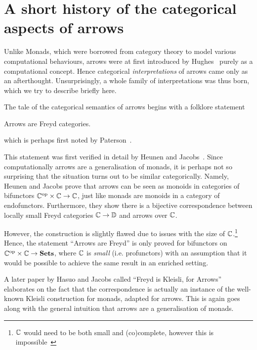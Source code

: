 \chapter{A short history of the categorical aspects of arrows}

Unlike Monads, which were borrowed from category theory to model various
computational behaviours, arrows were at first introduced by
Hughes~\cite{hughes-monad2arr} purely as a computational concept. Hence
categorical \emph{interpretations} of arrows came only as an afterthought.
Unsurprisingly, a whole family of interpretations was thus born, which we try
to describe briefly here. %

The tale of the categorical semantics of arrows begins with a folklore
statement
\begin{displayquote}Arrows are Freyd categories.\end{displayquote}
which is perhaps first noted by Paterson~\cite{paterson}.

This statement was first verified in detail by Heunen and
Jacobs~\cite{arr-like-mon}. Since computationally arrows are a generalisation
of monads, it is perhaps not so surprising that the situation turns out to be
similar categorically. Namely, Heunen and Jacobs prove that arrows can be
seen as monoids in categories of bifunctors ${\mathbb{C}}^{\text{op}} \times \mathbb{C} \to
\mathbb{C}$, just like monads are monoids in a category of endofunctors.
Furthermore, they show there is a bijective correspondence between locally
small Freyd categories $\mathbb{C} \to \mathbb{D}$ and arrows over $\mathbb{C}$.

However, the construction is slightly flawed due to issues with the size of
$\mathbb{C}$.\footnote{$\mathbb{C}$ would need to be both small and (co)complete, however
this is impossible~\cite[Chapter 3]{freyd-abelian-cats}} %
Hence, the statement \enquote{Arrows are Freyd} is only proved for bifunctors
on ${\mathbb{C}}^{\text{op}} \times \mathbb{C} \to \mathbf{Sets}$, where $\mathbb{C}$ is \emph{small} (i.e.
profunctors) with an assumption that it would be possible to achieve the same
result in an enriched setting.

A later paper by Hasuo and Jacobs called ``Freyd is Kleisli, for
Arrows''~\cite{freyd-is-kleisli} elaborates on the fact that the correspondence
is actually an instance of the well-known Kleisli construction for monads,
adapted for arrows. This is again goes along with the general intuition that
arrows are a generalisation of monads.

